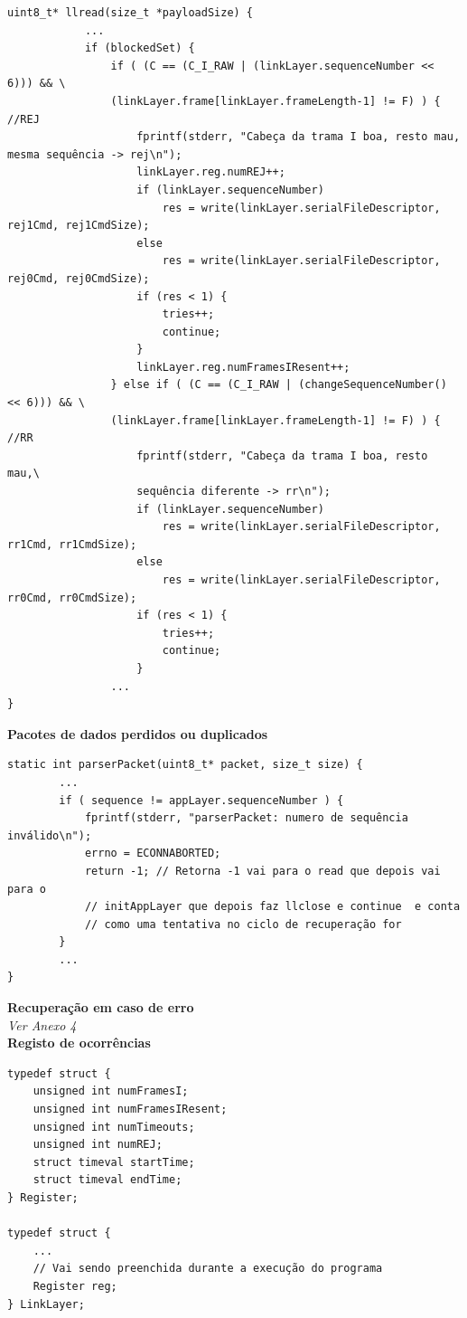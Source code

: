 \documentclass[a4paper]{article}
\begin{document}
\begin{verbatim}
uint8_t* llread(size_t *payloadSize) {
            ...
            if (blockedSet) {
                if ( (C == (C_I_RAW | (linkLayer.sequenceNumber << 6))) && \
                (linkLayer.frame[linkLayer.frameLength-1] != F) ) { //REJ
                    fprintf(stderr, "Cabeça da trama I boa, resto mau, mesma sequência -> rej\n");
                    linkLayer.reg.numREJ++;
                    if (linkLayer.sequenceNumber)
                        res = write(linkLayer.serialFileDescriptor, rej1Cmd, rej1CmdSize);
                    else
                        res = write(linkLayer.serialFileDescriptor, rej0Cmd, rej0CmdSize);
                    if (res < 1) {
                        tries++;
                        continue;
                    }
                    linkLayer.reg.numFramesIResent++;
                } else if ( (C == (C_I_RAW | (changeSequenceNumber() << 6))) && \
                (linkLayer.frame[linkLayer.frameLength-1] != F) ) { //RR
                    fprintf(stderr, "Cabeça da trama I boa, resto mau,\
                    sequência diferente -> rr\n");
                    if (linkLayer.sequenceNumber)
                        res = write(linkLayer.serialFileDescriptor, rr1Cmd, rr1CmdSize);
                    else
                        res = write(linkLayer.serialFileDescriptor, rr0Cmd, rr0CmdSize);
                    if (res < 1) {
                        tries++;
                        continue;
                    }
                ...
}
\end{verbatim}

\noindent\textbf{Pacotes de dados perdidos ou duplicados}
\begin{verbatim}
static int parserPacket(uint8_t* packet, size_t size) {
        ...
        if ( sequence != appLayer.sequenceNumber ) {
            fprintf(stderr, "parserPacket: numero de sequência inválido\n");
            errno = ECONNABORTED;
            return -1; // Retorna -1 vai para o read que depois vai para o
            // initAppLayer que depois faz llclose e continue  e conta
            // como uma tentativa no ciclo de recuperação for
        }
        ...
}
\end{verbatim}

\noindent\textbf{Recuperação em caso de erro}\\\textit{Ver Anexo 4}\\

\noindent\textbf{Registo de ocorrências}
\begin{verbatim}
typedef struct {
    unsigned int numFramesI;
    unsigned int numFramesIResent;
    unsigned int numTimeouts;
    unsigned int numREJ;
    struct timeval startTime;
    struct timeval endTime;
} Register;

typedef struct {
    ...
    // Vai sendo preenchida durante a execução do programa
    Register reg;
} LinkLayer;
\end{verbatim}
\end{document}
